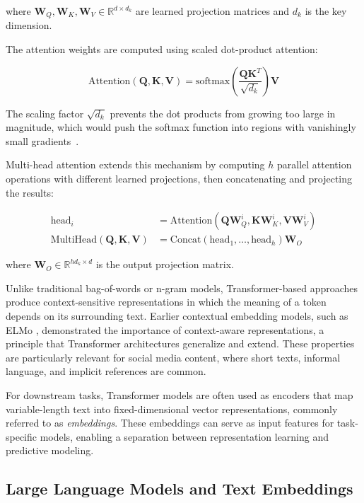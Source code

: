 where $\mathbf{W}_Q, \mathbf{W}_K, \mathbf{W}_V \in \mathbb{R}^{d \times d_k}$ are learned projection matrices and $d_k$ is the key dimension.

The attention weights are computed using scaled dot-product attention:

\begin{equation}
\text{Attention}(\mathbf{Q}, \mathbf{K}, \mathbf{V}) = \text{softmax}\left(\frac{\mathbf{Q}\mathbf{K}^T}{\sqrt{d_k}}\right)\mathbf{V}
\end{equation}

The scaling factor $\sqrt{d_k}$ prevents the dot products from growing too large in magnitude, which would push the softmax function into regions with vanishingly small gradients~\cite{Vaswani2017}.

Multi-head attention extends this mechanism by computing $h$ parallel attention operations with different learned projections, then concatenating and projecting the results:

\begin{align}
\text{head}_i &= \text{Attention}(\mathbf{Q}\mathbf{W}_Q^i, \mathbf{K}\mathbf{W}_K^i, \mathbf{V}\mathbf{W}_V^i) \\
\text{MultiHead}(\mathbf{Q}, \mathbf{K}, \mathbf{V}) &= \text{Concat}(\text{head}_1, \ldots, \text{head}_h)\mathbf{W}_O
\end{align}

where $\mathbf{W}_O \in \mathbb{R}^{hd_k \times d}$ is the output projection matrix.


Unlike traditional bag-of-words or n-gram models, Transformer-based approaches produce context-sensitive representations in which the meaning of a token depends on its surrounding text. Earlier contextual embedding models, such as ELMo \cite{Peters2018}, demonstrated the importance of context-aware representations, a principle that Transformer architectures generalize and extend. These properties are particularly relevant for social media content, where short texts, informal language, and implicit references are common.

For downstream tasks, Transformer models are often used as encoders that map variable-length text into fixed-dimensional vector representations, commonly referred to as \emph{embeddings}. These embeddings can serve as input features for task-specific models, enabling a separation between representation learning and predictive modeling.

\subsection{Large Language Models and Text Embeddings}

